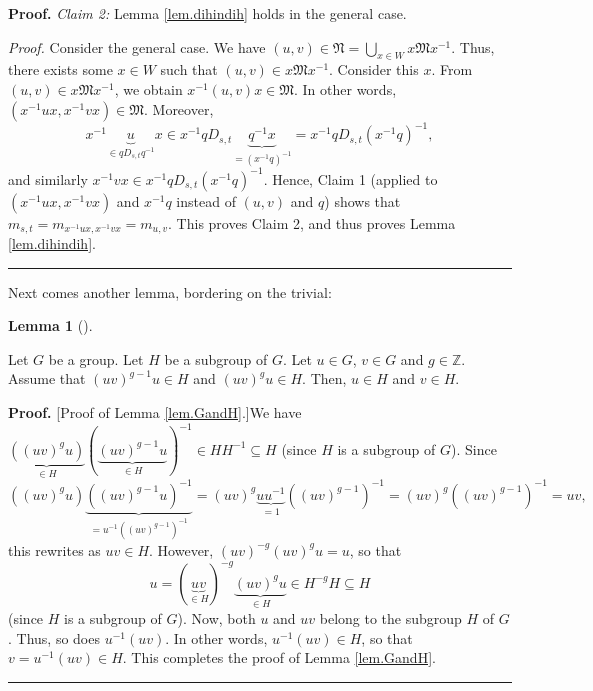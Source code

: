\documentclass[numbers=enddot,12pt,final,onecolumn,notitlepage,abstracton]{scrartcl}%
\theoremstyle{definition}
\newtheorem{lem}[theo]{Lemma}
\newenvironment{lemma}[1][]
{\begin{lem}[#1]\begin{leftbar}}
{\end{leftbar}\end{lem}}
\newenvironment{proof}[1][Proof]{\noindent\textbf{#1.} }{\ \rule{0.5em}{0.5em}}
\begin{document}
\begin{proof}
\textit{Claim 2:} Lemma \ref{lem.dihindih} holds in the general case.

\textit{Proof.} Consider the general case. We have $\left(  u,v\right)
\in\mathfrak{N}=\bigcup_{x\in W}x\mathfrak{M}x^{-1}$. Thus, there exists some
$x\in W$ such that $\left(  u,v\right)  \in x\mathfrak{M}x^{-1}$. Consider
this $x$. From $\left(  u,v\right)  \in x\mathfrak{M}x^{-1}$, we obtain
$x^{-1}\left(  u,v\right)  x\in\mathfrak{M}$. In other words, $\left(
x^{-1}ux,x^{-1}vx\right)  \in\mathfrak{M}$. Moreover,
\[
x^{-1}\underbrace{u}_{\in qD_{s,t}q^{-1}}x\in x^{-1}qD_{s,t}\underbrace{q^{-1}%
x}_{=\left(  x^{-1}q\right)  ^{-1}}=x^{-1}qD_{s,t}\left(  x^{-1}q\right)
^{-1},
\]
and similarly $x^{-1}vx\in x^{-1}qD_{s,t}\left(  x^{-1}q\right)  ^{-1}$.
Hence, Claim 1 (applied to $\left(  x^{-1}ux,x^{-1}vx\right)  $ and $x^{-1}q$
instead of $\left(  u,v\right)  $ and $q$) shows that $m_{s,t}=m_{x^{-1}%
ux,x^{-1}vx}=m_{u,v}$. This proves Claim 2, and thus proves Lemma
\ref{lem.dihindih}.
\end{proof}

Next comes another lemma, bordering on the trivial:

\begin{lemma}
\label{lem.GandH}Let $G$ be a group. Let $H$ be a subgroup of $G$. Let $u\in
G$, $v\in G$ and $g\in\mathbb{Z}$. Assume that $\left(  uv\right)  ^{g-1}u\in
H$ and $\left(  uv\right)  ^{g}u\in H$. Then, $u\in H$ and $v\in H$.
\end{lemma}

\begin{proof}
[Proof of Lemma \ref{lem.GandH}.]We have $\underbrace{\left(  \left(
uv\right)  ^{g}u\right)  }_{\in H}\left(  \underbrace{\left(  uv\right)
^{g-1}u}_{\in H}\right)  ^{-1}\in HH^{-1}\subseteq H$ (since $H$ is a subgroup
of $G$). Since
\[
\left(  \left(  uv\right)  ^{g}u\right)  \underbrace{\left(  \left(
uv\right)  ^{g-1}u\right)  ^{-1}}_{=u^{-1}\left(  \left(  uv\right)
^{g-1}\right)  ^{-1}}=\left(  uv\right)  ^{g}\underbrace{uu^{-1}}_{=1}\left(
\left(  uv\right)  ^{g-1}\right)  ^{-1}=\left(  uv\right)  ^{g}\left(  \left(
uv\right)  ^{g-1}\right)  ^{-1}=uv,
\]
this rewrites as $uv\in H$. However, $\left(  uv\right)  ^{-g}\left(
uv\right)  ^{g}u=u$, so that
\[
u=\left(  \underbrace{uv}_{\in H}\right)  ^{-g}\underbrace{\left(  uv\right)
^{g}u}_{\in H}\in H^{-g}H\subseteq H
\]
(since $H$ is a subgroup of $G$). Now, both $u$ and $uv$ belong to the
subgroup $H$ of $G$. Thus, so does $u^{-1}\left(  uv\right)  $. In other
words, $u^{-1}\left(  uv\right)  \in H$, so that $v=u^{-1}\left(  uv\right)
\in H$. This completes the proof of Lemma \ref{lem.GandH}.
\end{proof}
\end{document}
